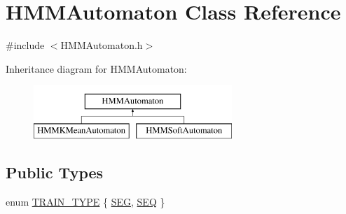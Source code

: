 \hypertarget{class_h_m_m_automaton}{\section{H\+M\+M\+Automaton Class Reference}
\label{class_h_m_m_automaton}
}


{\ttfamily \#include $<$H\+M\+M\+Automaton.\+h$>$}

Inheritance diagram for H\+M\+M\+Automaton\+:\begin{figure}[H]
\begin{center}
\leavevmode
\includegraphics[height=2.000000cm]{class_h_m_m_automaton}
\end{center}
\end{figure}
\subsection*{Public Types}
\begin{DoxyCompactItemize}
\item 
enum \hyperlink{class_h_m_m_automaton_aa3476c86db5e0791de6f07076f220348}{T\+R\+A\+I\+N\+\_\+\+T\+Y\+P\+E} \{ \hyperlink{class_h_m_m_automaton_aa3476c86db5e0791de6f07076f220348a725fd42edf8b8e4b515b6296a7d67bb3}{S\+E\+G}, 
\hyperlink{class_h_m_m_automaton_aa3476c86db5e0791de6f07076f220348a0dde40730a38683ab3845601ec57591b}{S\+E\+Q}
 \}
\end{DoxyCompactItemize}
